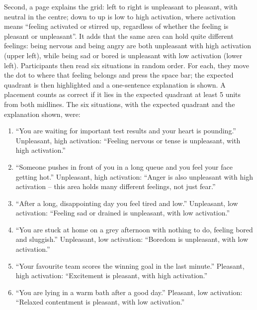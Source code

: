 \documentclass[11pt,a4paper]{article}
\begin{document}
Second, a page explains the grid: left to right is unpleasant to pleasant, with neutral in the centre; down to up is
low to high activation, where activation means \enquote{feeling activated or stirred up, regardless of whether the
feeling is pleasant or unpleasant}. It adds that the same area can hold quite different feelings: being nervous and
being angry are both unpleasant with high activation (upper left), while being sad or bored is unpleasant with low
activation (lower left). Participants then read six situations in random order. For each, they move the dot to where
that feeling belongs and press the space bar; the expected quadrant is then highlighted and a one-sentence explanation
is shown. A placement counts as correct if it lies in the expected quadrant at least 5 units from both midlines. The
six situations, with the expected quadrant and the explanation shown, were:
\begin{enumerate}\setlength{\itemsep}{0pt}
\item \enquote{You are waiting for important test results and your heart is pounding.} Unpleasant, high activation:
  \enquote{Feeling nervous or tense is unpleasant, with high activation.}
\item \enquote{Someone pushes in front of you in a long queue and you feel your face getting hot.} Unpleasant, high
  activation: \enquote{Anger is also unpleasant with high activation -- this area holds many different feelings, not
  just fear.}
\item \enquote{After a long, disappointing day you feel tired and low.} Unpleasant, low activation: \enquote{Feeling
  sad or drained is unpleasant, with low activation.}
\item \enquote{You are stuck at home on a grey afternoon with nothing to do, feeling bored and sluggish.} Unpleasant,
  low activation: \enquote{Boredom is unpleasant, with low activation.}
\item \enquote{Your favourite team scores the winning goal in the last minute.} Pleasant, high activation:
  \enquote{Excitement is pleasant, with high activation.}
\item \enquote{You are lying in a warm bath after a good day.} Pleasant, low activation: \enquote{Relaxed contentment
  is pleasant, with low activation.}
\end{enumerate}
\end{document}
